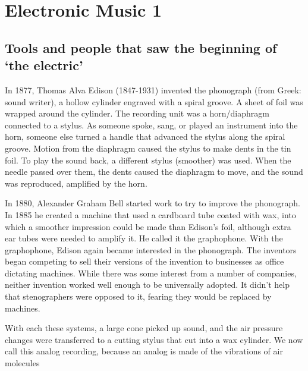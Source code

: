 
\chapter{Electronic Music 1}
\label{history1}

\section{Tools and people that saw the beginning of `the electric'}

In 1877, Thomas Alva Edison (1847-1931) invented the phonograph (from Greek: sound writer), a hollow cylinder engraved with a spiral groove. A sheet of foil was wrapped around the cylinder. The recording unit was a horn/diaphragm connected to a stylus. As someone spoke, sang, or played an instrument into the horn, someone else turned a handle that advanced the stylus along the spiral groove. Motion from the diaphragm caused the stylus to make dents in the tin foil. To play the sound back, a different stylus (smoother) was used. When the needle passed over them, the dents caused the diaphragm to move, and the sound was reproduced, amplified by the horn.

In 1880, Alexander Graham Bell started work to try to improve the phonograph. In 1885 he created a machine that used a cardboard tube coated with wax, into which a smoother impression could be made than Edison's foil, although extra ear tubes were needed to amplify it. He called it the graphophone. With the graphophone, Edison again became interested in the phonograph. The inventors began competing to sell their versions of the invention to businesses as office dictating machines. While there was some interest from a number of companies, neither invention worked well enough to be universally adopted. It didn't help that stenographers were opposed to it, fearing they would be replaced by machines.

With each these systems, a large cone picked up sound, and the air pressure changes were transferred to a cutting stylus that cut into a wax cylinder. We now call this analog recording, because an analog is made of the vibrations of air molecules

